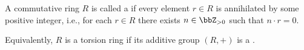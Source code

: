 \begin{definition} \label{definition:torsion_ring}
A commutative ring $R$ is called a  if every element $r \in R$ is annihilated by some positive integer, i.e., for each $r \in R$ there exists $n \in \bbZ_{>0}$ such that $n \cdot r = 0$.

Equivalently, $R$ is a torsion ring if its additive group $(R, +)$ is a .
\end{definition}
